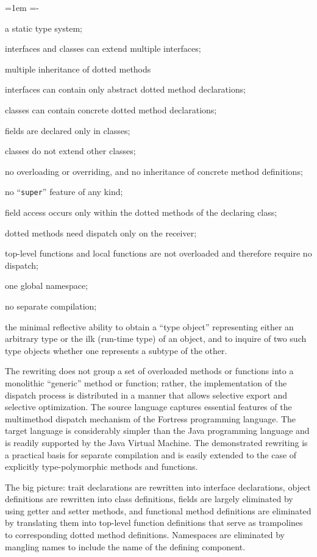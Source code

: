 \begin{trivlist}\leftskip=1em \itemindent=-\leftskip
\item[] a static type system;
\item[] interfaces and classes can extend multiple interfaces;
\item[] multiple inheritance of dotted methods
\item[] interfaces can contain only abstract dotted method declarations;
\item[] classes can contain concrete dotted method declarations;
\item[] fields are declared only in classes;
\item[] classes do not extend other classes;
\item[] no overloading or overriding, and no inheritance of concrete method definitions;
\item[] no ``{\tt super}'' feature of any kind;
\item[] field access occurs only within the dotted methods of the declaring class;
\item[] dotted methods need dispatch only on the receiver;
\item[] top-level functions and local functions are not overloaded and therefore require no dispatch;
\item[] one global namespace;
\item[] no separate compilation;
\item[] the minimal reflective ability to obtain a ``type object'' representing either
an arbitrary type or the ilk (run-time type) of an object, and to inquire of
two such type objects whether one represents a subtype of the other.
\end{trivlist}

The rewriting does not group a set of overloaded methods or functions into a monolithic ``generic'' method or function;
rather, the implementation of the dispatch process is distributed in a manner that allows selective export and selective optimization.
The source language captures essential features of the multimethod dispatch mechanism of the Fortress programming language.
The target language is considerably simpler than the Java programming language and is readily supported by the Java Virtual Machine.
The demonstrated rewriting is a practical basis for separate compilation and is easily extended to the case of
explicitly type-polymorphic methods and functions.

The big picture: trait declarations are rewritten into interface declarations,
object definitions are rewritten into class definitions,
fields are largely eliminated by using getter and setter methods,
and functional method definitions are eliminated by translating them into
top-level function definitions that serve as trampolines to corresponding
dotted method definitions.  Namespaces are eliminated by mangling names
to include the name of the defining component.

